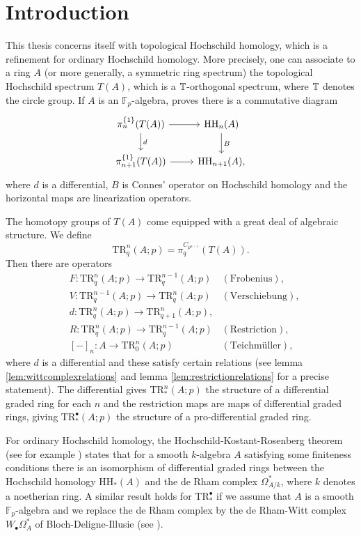 \chapter*{Introduction}
This thesis concerns itself with topological Hochschild homology,
which is a refinement for ordinary Hochschild homology.
More precisely, one can associate to a ring $A$ (or more generally, a symmetric ring spectrum)
 the topological Hochschild spectrum $T(A)$, which is a $\mathbb{T}$-orthogonal
spectrum, where $\mathbb{T}$ denotes the circle group. If $A$ is an $\mathbb{F}_p$-algebra,
\cite[Proposition~1.4.6, \pno~14]{hesselholtacta} proves there is a commutative diagram
\[
\begin{tikzcd}
\pi_n^{\{1\}}(T(A))
\arrow{d}{d}\arrow{r}
&\mathrm{HH}_n(A)
\arrow{d}{B}\\
\pi_{n+1}^{\{1\}}(T(A))
\arrow{r}
&\mathrm{HH}_{n+1}(A),
\end{tikzcd}
\]
where $d$ is a differential, $B$ is Connes' operator
on Hochschild homology and the horizontal maps are
linearization operators.

The homotopy groups of $T(A)$ come equipped with
a great deal of algebraic structure. We define
\[\mathrm{TR}^n_q(A;p) = \pi_q^{C_{p^{n-1}}}(T(A)).\]
Then there are operators
\begin{align*}
&F:\mathrm{TR}^n_q(A;p)\rightarrow \mathrm{TR}^{n-1}_q(A;p) &(\mathrm{Frobenius}),\\
&V:\mathrm{TR}^{n-1}_q(A;p)\rightarrow \mathrm{TR}^{n}_q(A;p) &(\mathrm{Verschiebung}),\\
&d:\mathrm{TR}^n_q(A;p)\rightarrow \mathrm{TR}^n_{q+1}(A;p),\\
&R:\mathrm{TR}^n_q(A ;p)\to \mathrm{TR}^{n-1}_q(A;p) &(\mathrm{Restriction}),\\
&[-]_n :A\to \mathrm{TR}^n_0(A;p) &(\text{Teichm\"uller}),
\end{align*}
where $d$ is a differential and these satisfy certain relations (see lemma
\ref{lem:wittcomplexrelations} and lemma \ref{lem:restrictionrelations}
for a precise statement). The differential gives $\mathrm{TR}^n_\ast(A;p)$
the structure of a differential graded ring for each $n$ and the restriction maps are maps of
differential graded rings, giving $\mathrm{TR}^\bullet_\ast(A;p)$
the structure of a pro-differential graded ring.

For ordinary Hochschild homology, the Hochschild-Kostant-Rosenberg
theorem (see for example \cite[Theorem~9.4.7, \pno~322]{weibel})
states that for a smooth $k$-algebra $A$ satisfying some finiteness conditions
there is an isomorphism of differential graded rings between the Hochschild homology
$\mathrm{HH}_{\ast}(A)$ and
the de Rham complex $\Omega^\ast_{A/k}$, where $k$ denotes a noetherian ring.
A similar result holds for $\mathrm{TR}^\bullet_\ast$ if
we assume that $A$ is a smooth $\mathbb{F}_p$-algebra
and we replace the de Rham complex by the de Rham-Witt complex
$W_\bullet\Omega^\ast_A$ of Bloch-Deligne-Illusie (see \cite[Theorem~B, \pno~3]{hesselholtacta}).

